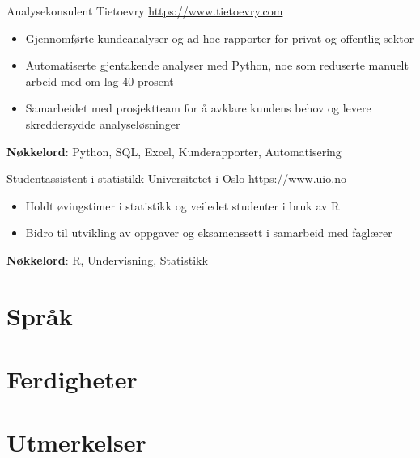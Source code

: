 \documentclass[a4paper, serif, 10pt]{moderncv}
\begin{document}
        {Analysekonsulent}
        {Tietoevry}
        {\url{https://www.tietoevry.com}}
        {}
        {\begin{itemize}
\item Gjennomførte kundeanalyser og ad-hoc-rapporter for privat og offentlig sektor
\item Automatiserte gjentakende analyser med Python, noe som reduserte manuelt arbeid med om lag 40 prosent
\item Samarbeidet med prosjektteam for å avklare kundens behov og levere skreddersydde analyseløsninger
\end{itemize}
\textbf{Nøkkelord}: Python, SQL, Excel, Kunderapporter, Automatisering}

        {Studentassistent i statistikk}
        {Universitetet i Oslo}
        {\url{https://www.uio.no}}
        {}
        {\begin{itemize}
\item Holdt øvingstimer i statistikk og veiledet studenter i bruk av R
\item Bidro til utvikling av oppgaver og eksamenssett i samarbeid med faglærer
\end{itemize}
\textbf{Nøkkelord}: R, Undervisning, Statistikk}
\section{Språk}

\section{Ferdigheter}

\section{Utmerkelser}
\end{document}
